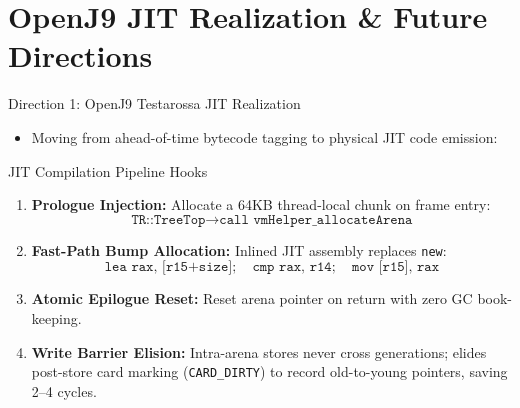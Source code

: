 \documentclass[11pt]{beamer}
\begin{document}
\section[Future Directions]{OpenJ9 JIT Realization \& Future Directions}

\begin{frame}{Direction 1: OpenJ9 Testarossa JIT Realization}
  \vspace{-0.5em}
  \begin{itemize}\setlength{\itemsep}{0pt}
    \item Moving from ahead-of-time bytecode tagging to physical JIT code emission:
  \end{itemize}
  \vspace{-0.6em}
  \begin{block}{JIT Compilation Pipeline Hooks}
    \small
    \begin{enumerate}\setlength{\itemsep}{0.5pt}
      \item \textbf{Prologue Injection:} Allocate a 64KB thread-local chunk on frame entry:
        \vspace{-0.3em}
        $$\texttt{TR::TreeTop} \longrightarrow \texttt{call vmHelper\_allocateArena}$$
        \vspace{-0.4em}
      \item \textbf{Fast-Path Bump Allocation:} Inlined JIT assembly replaces \texttt{new}:
        \vspace{-0.3em}
        $$\texttt{lea rax, [r15+size]}; \quad \texttt{cmp rax, r14}; \quad \texttt{mov [r15], rax}$$
        \vspace{-0.5em}
      \item \textbf{Atomic Epilogue Reset:} Reset arena pointer on return with zero GC book-keeping.
      \item \textbf{Write Barrier Elision:} Intra-arena stores never cross generations; elides post-store card marking (\texttt{CARD\_DIRTY}) to record old-to-young pointers, saving 2--4 cycles.
    \end{enumerate}
  \end{block}
\end{frame}
\end{document}
